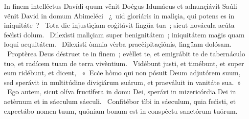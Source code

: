 { In finem intelléctus Davídi  quum vënit Doégus Idumáeus et adnunçiávit Saúli vënit David in domum Abimeléci}
{%
~¿~uid gloriáris in malìçia, qui potens es in iniquitáte~? 
~Tota die injustìçiam coġitávit lìngüa tua~; sicut novácula acúta feċìsti dolum. 
~Dilexìsti malìçiam super benignitátem~; iniquitátem maġis quam loqui aequitátem. 
~Dilexìsti òmnia vèrba praeċipitaçiónis, lìngüam dolósam. 
~Proptèrea Deus déstruet te in finem~; evèllet te, et emigrábit te de tabernáculo tuo, et radícem tuam de terra vivèntium. 
~Vidébunt justi, et timébunt, et super eum ridébunt, et dicent, 
~«~Ecċe hòmo qui non pósuit Deum adjutórem suum, sed sperávit in multitúdine diviçiárum suárum, et praeváluit in vanitáte sua.~»
~Ego autem, sicut olíva fructìfera in domu Dei, sperávi in mizericórdia Dei in aetèrnum et in sáeculum sáeculi. 
~Confitébor tìbi in sáeculum, quia feċìsti, et expectábo nomen tuum, quóniam bonum est in conspèctu sanctórum tuórum. 
}

